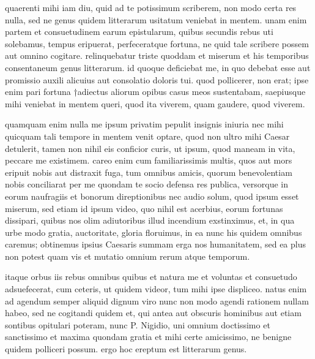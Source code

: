 


 quaerenti mihi iam diu, quid ad te potissimum scriberem, non modo certa res nulla, sed ne genus quidem litterarum usitatum veniebat in mentem. unam enim partem et consuetudinem earum epistularum, quibus secundis rebus uti solebamus, tempus eripuerat, perfeceratque fortuna, ne quid tale scribere possem aut omnino cogitare. relinquebatur triste quoddam et miserum et his temporibus consentaneum genus litterarum. id quoque deficiebat me, in quo debebat esse aut promissio auxili alicuius aut consolatio doloris tui. quod pollicerer, non erat; ipse enim pari fortuna †adiectus aliorum opibus casus meos sustentabam, saepiusque mihi veniebat in mentem queri, quod ita viverem, quam gaudere, quod viverem.

 quamquam enim nulla me ipsum privatim pepulit insignis iniuria nec mihi quicquam tali tempore in mentem venit optare, quod non ultro mihi Caesar detulerit, tamen non nihil eis conficior curis, ut ipsum, quod maneam in vita, peccare me existimem. careo enim cum familiarissimis multis, quos aut mors eripuit nobis aut distraxit fuga, tum omnibus amicis, quorum benevolentiam nobis conciliarat per me quondam te socio defensa res publica, versorque in eorum naufragiis et bonorum direptionibus nec audio solum, quod ipsum esset miserum, sed etiam id ipsum video, quo nihil est acerbius, eorum fortunas dissipari, quibus nos olim adiutoribus illud incendium exstinximus, et, in qua urbe modo gratia, auctoritate, gloria floruimus, in ea nunc his quidem omnibus caremus; obtinemus ipsius Caesaris summam erga nos humanitatem, sed ea plus non potest quam vis et mutatio omnium rerum atque temporum.

 itaque orbus iis rebus omnibus quibus et natura me et voluntas et consuetudo adsuefecerat, cum ceteris, ut quidem videor, tum mihi ipse displiceo. natus enim ad agendum semper aliquid dignum viro nunc non modo agendi rationem nullam habeo, sed ne cogitandi quidem et, qui antea aut obscuris hominibus aut etiam sontibus opitulari poteram, nunc P. Nigidio, uni omnium doctissimo et sanctissimo et maxima quondam gratia et mihi certe amicissimo, ne benigne quidem polliceri possum. ergo hoc ereptum est litterarum genus.


